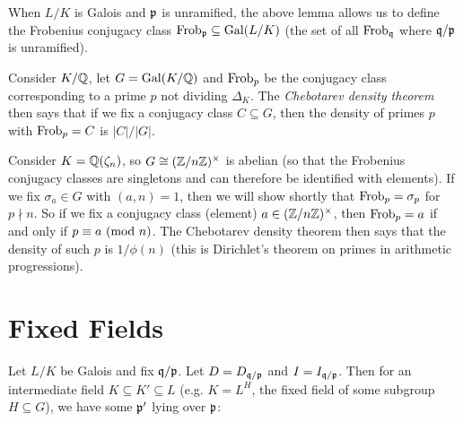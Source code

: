 \begin{remark}
  When $L / K$ is Galois and $\mathfrak{p}$ is unramified, the
  above lemma allows us to define
  the Frobenius conjugacy class $\operatorname{Frob}_{\mathfrak{p}} \subseteq \operatorname{Gal}(L / K)$ (the set of all $\operatorname{Frob}_{\mathfrak{q}}$ where $\mathfrak{q} / \mathfrak{p}$
  is unramified).
\end{remark}

\begin{example}
  Consider $K / \mathbb{Q}$, let $G = \operatorname{Gal}(K / \mathbb{Q})$ and
  $\operatorname{Frob}_p$ be the conjugacy class corresponding
  to a prime $p$ not dividing $\Delta_K$. The
  \emph{Chebotarev density theorem} then says that
  if we fix a conjugacy class $C \subseteq G$, then
  the density of primes $p$ with $\operatorname{Frob}_p = C$ is
  $|C| / |G|$.
\end{example}

\begin{example}
  Consider $K = \mathbb{Q}(\zeta_n)$, so $G \cong (\mathbb{Z} / n\mathbb{Z})^\times$
  is abelian (so that the Frobenius conjugacy classes
  are singletons and can therefore be identified
  with elements). If we fix $\sigma_a \in G$
  with $(a, n) = 1$, then we will show shortly
  that $\operatorname{Frob}_p = \sigma_p$ for $p \nmid n$.
  So if we fix a conjugacy class (element)
  $a \in (\mathbb{Z} / n\mathbb{Z})^\times$, then $\operatorname{Frob}_p = a$
  if and only if $p \equiv a \ (\mathrm{mod}\ n)$. The Chebotarev
  density theorem then says that the density of
  such $p$ is $1 / \phi(n)$ (this is
  Dirichlet's theorem on primes in arithmetic
  progressions).
\end{example}

\section{Fixed Fields}

\begin{remark}
  Let $L / K$ be Galois and fix $\mathfrak{q} / \mathfrak{p}$.
  Let $D = D_{\mathfrak{q} / \mathfrak{p}}$ and $I = I_{\mathfrak{q} / \mathfrak{p}}$. Then for
  an intermediate field $K \subseteq K' \subseteq L$
  (e.g. $K = L^H$, the fixed field of some subgroup
  $H \subseteq G$), we have some $\mathfrak{p}'$ lying over $\mathfrak{p}$:
  \begin{center}
  \end{center}
\end{remark}

